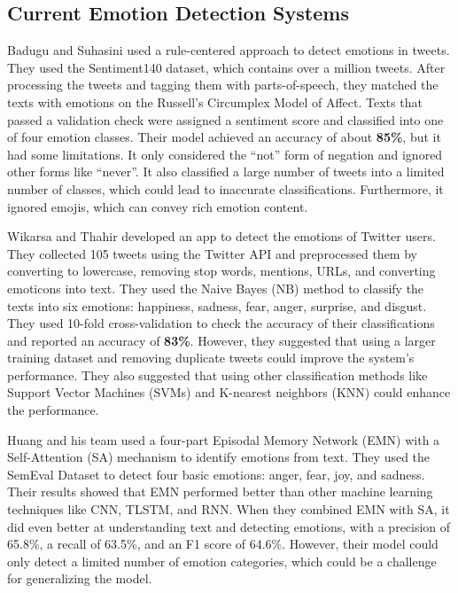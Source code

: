 \documentclass[12pt]{article}
\begin{document}
    \subsection*{Current Emotion Detection Systems}
    \par Badugu and Suhasini used a rule-centered approach to detect emotions in tweets. They used the Sentiment140 dataset, which contains over a million tweets. After processing the tweets and tagging them with parts-of-speech, they matched the texts with emotions on the Russell’s Circumplex Model of Affect. Texts that passed a validation check were assigned a sentiment score and classified into one of four emotion classes. Their model achieved an accuracy of about \textbf{85\%}, but it had some limitations. It only considered the “not” form of negation and ignored other forms like “never”. It also classified a large number of tweets into a limited number of classes, which could lead to inaccurate classifications. Furthermore, it ignored emojis, which can convey rich emotion content.\cite{badugu2017emotion}
    \par Wikarsa and Thahir developed an app to detect the emotions of Twitter users. They collected 105 tweets using the Twitter API and preprocessed them by converting to lowercase, removing stop words, mentions, URLs, and converting emoticons into text. They used the Naive Bayes (NB) method to classify the texts into six emotions: happiness, sadness, fear, anger, surprise, and disgust. They used 10-fold cross-validation to check the accuracy of their classifications and reported an accuracy of \textbf{83\%}. However, they suggested that using a larger training dataset and removing duplicate tweets could improve the system’s performance. They also suggested that using other classification methods like Support Vector Machines (SVMs) and K-nearest neighbors (KNN) could enhance the performance.
    \par Huang and his team used a four-part Episodal Memory Network (EMN) with a Self-Attention (SA) mechanism to identify emotions from text. They used the SemEval Dataset to detect four basic emotions: anger, fear, joy, and sadness. Their results showed that EMN performed better than other machine learning techniques like CNN, TLSTM, and RNN. When they combined EMN with SA, it did even better at understanding text and detecting emotions, with a precision of 65.8\%, a recall of 63.5\%, and an F1 score of 64.6\%. However, their model could only detect a limited number of emotion categories, which could be a challenge for generalizing the model.
\end{document}
